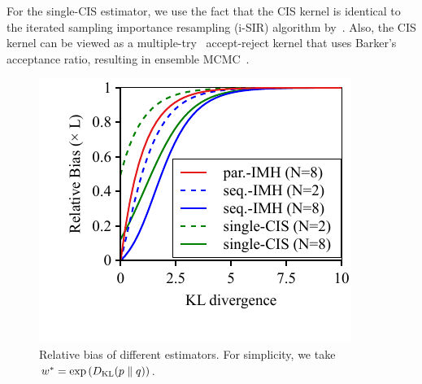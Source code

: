 
%

%
For the single-CIS estimator, we use the fact that the CIS kernel is identical to the iterated sampling importance resampling (i-SIR) algorithm by~\citet{andrieu_uniform_2018}.
Also, the CIS kernel can be viewed as a multiple-try~\citet[Table 12]{martino_review_2018a} accept-reject kernel that uses Barker's~\citep{barker_monte_1965} acceptance ratio, resulting in ensemble MCMC~\citet{austad_parallel_2007, neal_mcmc_2011a}.
%

%
\begin{figure}[H]
\vspace{-0.15in}
  \centering
  \includegraphics[scale=0.9]{figures/bias_01.pdf}
  \vspace{-0.35in}
  \caption{Relative bias of different estimators.
  For simplicity, we take \(w^* = \exp\left( D_{\mathrm{KL}}(p\parallel q) \right)\).}\label{fig:bias}
\vspace{-0.1in}
\end{figure}
%

\vspace{-0.05in}
